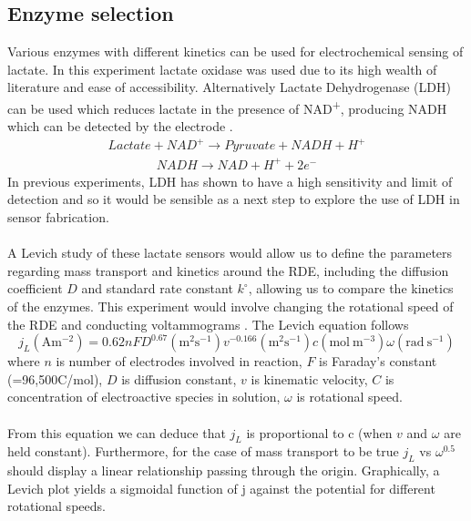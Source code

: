 \begin{appendices}
\subsection{Enzyme selection}
Various enzymes with different kinetics can be used for electrochemical sensing of lactate. In this experiment lactate oxidase was used due to its high wealth of literature and ease of accessibility\cite{romero2010amperometric}. Alternatively Lactate Dehydrogenase (LDH) can be used which reduces lactate in the presence of NAD\textsuperscript{+}, producing NADH which can be detected by the electrode \cite{narayanan2020lactic}.
\begin{align}
    Lactate + NAD^{+} \xrightarrow{} Pyruvate + NADH + H^{+}
\end{align}
\begin{align}
    NADH \xrightarrow{} NAD + H^{+} + 2e^{-}
\end{align}
In previous experiments, LDH has shown to have a high sensitivity and limit of detection and so it would be sensible as a next step to explore the use of LDH in sensor fabrication. \\\\
A Levich study of these lactate sensors would allow us to define the parameters regarding mass transport and kinetics around the RDE, including the diffusion coefficient $D$ and standard rate constant $k^{\circ}$, allowing us to compare the kinetics of the enzymes. This experiment would involve changing the rotational speed of the RDE and conducting voltammograms \cite{treimer2002consideration}.  The Levich equation follows
\begin{equation}
    j_{L} \mathrm{(Am^{-2})} = 0.62nFD^{0.67}\mathrm{(m^{2}s^{-1})} v^{-0.166}\mathrm{(m^{2}s^{-1})}c\mathrm{(mol\ m^{-3})}\omega\mathrm{(rad \ s^{-1})}
\end{equation}
where $n$ is number of electrodes involved in reaction, $F$ is Faraday’s constant (=96,500C/mol), $D$ is diffusion constant, $v$ is kinematic velocity, $C$ is concentration of electroactive species in solution, $\omega$ is rotational speed.\\\\
From this equation we can deduce that $j_{L}$ is proportional to c (when $v$ and $\omega$ are held constant). Furthermore, for the case of mass transport to be true $j_{L}$ vs $\omega^{0.5}$ should display a linear relationship passing through the origin.
Graphically, a Levich plot yields a sigmoidal function of j against the potential for different rotational speeds. \\\\

\end{appendices}
